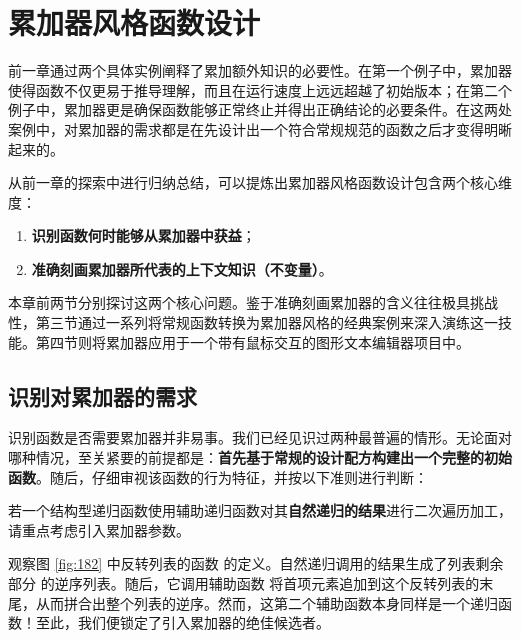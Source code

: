 
\chapter{累加器风格函数设计}
\label{sec:ch32_accumulator_style}

前一章通过两个具体实例阐释了累加额外知识的必要性。在第一个例子中，累加器使得函数不仅更易于推导理解，而且在运行速度上远远超越了初始版本；在第二个例子中，累加器更是确保函数能够正常终止并得出正确结论的必要条件。在这两处案例中，对累加器的需求都是在先设计出一个符合常规规范的函数之后才变得明晰起来的。

从前一章的探索中进行归纳总结，可以提炼出累加器风格函数设计包含两个核心维度：
\begin{enumerate}
  \item \textbf{识别函数何时能够从累加器中获益}；
  \item \textbf{准确刻画累加器所代表的上下文知识（不变量）}。
\end{enumerate}

本章前两节分别探讨这两个核心问题。鉴于准确刻画累加器的含义往往极具挑战性，第三节通过一系列将常规函数转换为累加器风格的经典案例来深入演练这一技能。第四节则将累加器应用于一个带有鼠标交互的图形文本编辑器项目中。

\section{识别对累加器的需求}
\label{sec:ch32_1}

识别函数是否需要累加器并非易事。我们已经见识过两种最普遍的情形。无论面对哪种情况，至关紧要的前提都是：\textbf{首先基于常规的设计配方构建出一个完整的初始函数}。随后，仔细审视该函数的行为特征，并按以下准则进行判断：

\begin{notebox}[准则 1：结构型递归中的累加器征兆]
若一个结构型递归函数使用辅助递归函数对其\textbf{自然递归的结果}进行二次遍历加工，请重点考虑引入累加器参数。
\end{notebox}

观察图 \ref{fig:182} 中反转列表的函数  的定义。自然递归调用的结果生成了列表剩余部分  的逆序列表。随后，它调用辅助函数  将首项元素追加到这个反转列表的末尾，从而拼合出整个列表的逆序。然而，这第二个辅助函数本身同样是一个递归函数！至此，我们便锁定了引入累加器的绝佳候选者。

